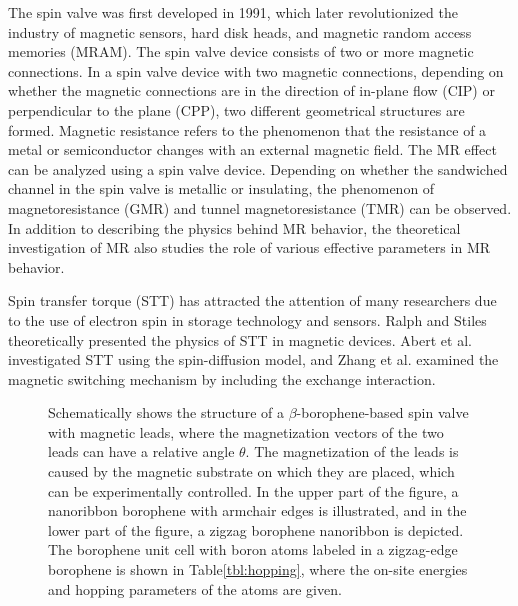 \documentclass[twoside,twocolumn,9pt]{article}
\begin{document}
The spin valve was first developed in 1991\cite{dieny1991giant}, which later revolutionized the industry of magnetic sensors, hard disk heads, and magnetic random access memories (MRAM)\cite{heim1994design,freitas1994spin,leal1994unshielded,tsang1994design}. The spin valve device consists of two or more magnetic connections. In a spin valve device with two magnetic connections, depending on whether the magnetic connections are in the direction of in-plane flow (CIP) or perpendicular to the plane (CPP), two different geometrical structures are formed. Magnetic resistance refers to the phenomenon that the resistance of a metal or semiconductor changes with an external magnetic field. The MR effect can be analyzed using a spin valve device\cite{bandyopadhyay2008introduction}. Depending on whether the sandwiched channel in the spin valve is metallic or insulating, the phenomenon of magnetoresistance (GMR) and tunnel magnetoresistance (TMR) can be observed\cite{fong2016spin}. In addition to describing the physics behind MR behavior, the theoretical investigation of MR also studies the role of various effective parameters in MR behavior\cite{harikumar2020non}.

Spin transfer torque (STT) has attracted the attention of many researchers due to the use of electron spin in storage technology and sensors\cite{liu2013spin}. Ralph and Stiles theoretically presented the physics of STT in magnetic devices\cite{ralph2008spin}. Abert et al. investigated STT using the spin-diffusion model\cite{abert2017field}, and Zhang et al. examined the magnetic switching mechanism by including the exchange interaction\cite{zhang2002mechanisms}.

\begin{figure*}
\caption{Schematically shows the structure of a $\beta$-borophene-based spin valve with magnetic leads, where the magnetization vectors of the two leads can have a relative angle $\theta$. The magnetization of the leads is caused by the magnetic substrate on which they are placed, which can be experimentally controlled. In the upper part of the figure, a nanoribbon borophene with armchair edges is illustrated, and in the lower part of the figure, a zigzag borophene nanoribbon is depicted. The borophene unit cell with boron atoms labeled in a zigzag-edge borophene is shown in Table\ref{tbl:hopping}, where the on-site energies and hopping parameters of the atoms are given.
}
\label{fig:model}
\end{figure*}
\end{document}

